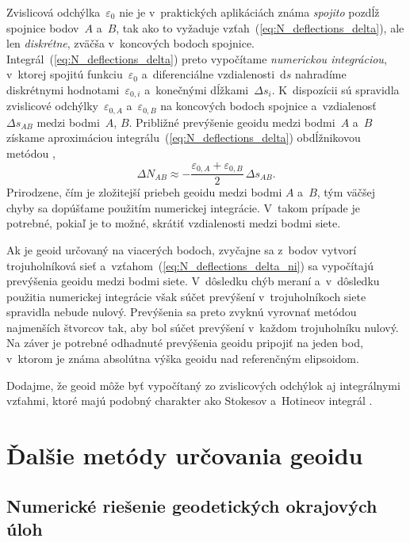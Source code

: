 \documentclass[a4paper, 12pt]{book}
\newcommand{\diff}{\mathrm d}
\begin{document}
Zvislicová odchýlka~$\varepsilon_0$ nie je v~praktických aplikáciách známa 
\emph{spojito} pozdĺž spojnice bodov~$A$ a~$B$, tak ako to vyžaduje 
vzťah~(\ref{eq:N_deflections_delta}), ale len \emph{diskrétne}, zväčša 
v~koncových bodoch spojnice.  Integrál~(\ref{eq:N_deflections_delta}) preto 
vypočítame \emph{numerickou integráciou}, v~ktorej spojitú 
funkciu~$\varepsilon_0$ a~diferenciálne vzdialenosti~$\diff s$ nahradíme 
diskrétnymi hodnotami~$\varepsilon_{0,i}$ a~konečnými dĺžkami~$\Delta s_i$.  
K~dispozícii sú spravidla zvislicové odchýlky~$\varepsilon_{0,A}$ 
a~$\varepsilon_{0,B}$ na koncových bodoch spojnice a~vzdialenosť~$\Delta 
s_{AB}$ medzi bodmi~$A$, $B$.  Približné prevýšenie geoidu medzi bodmi~$A$ 
a~$B$ získame aproximáciou integrálu~(\ref{eq:N_deflections_delta}) 
obdĺžnikovou metódou \parencite[pre popis obdĺžnikovej metódy pozri 
napríklad][]{Macak2021},
%
\begin{equation}
\label{eq:N_deflections_delta_ni}
\Delta N_{AB} \approx -\frac{\varepsilon_{0,A} + \varepsilon_{0,B}}{2} \, 
\Delta s_{AB}{.}
\end{equation}
%
Prirodzene, čím je zložitejší priebeh geoidu medzi bodmi $A$ a~$B$, tým väčšej 
chyby sa dopúšťame použitím numerickej integrácie.  V~takom prípade je 
potrebné, pokiaľ je to možné, skrátiť vzdialenosti medzi bodmi siete.

Ak je geoid určovaný na viacerých bodoch, zvyčajne sa z~bodov vytvorí 
trojuholníková sieť a~vzťahom~(\ref{eq:N_deflections_delta_ni}) sa vypočítajú 
prevýšenia geoidu medzi bodmi siete.  V~dôsledku chýb meraní a~v~dôsledku 
použitia numerickej integrácie však súčet prevýšení v~trojuholníkoch siete 
spravidla nebude nulový.  Prevýšenia sa preto zvyknú vyrovnať metódou 
najmenších štvorcov tak, aby bol súčet prevýšení v~každom trojuholníku nulový.  
Na záver je potrebné odhadnuté prevýšenia geoidu pripojiť na jeden bod, 
v~ktorom je známa absolútna výška geoidu nad referenčným elipsoidom.

Dodajme, že geoid môže byť vypočítaný zo zvislicových odchýlok aj integrálnymi 
vzťahmi, ktoré majú podobný charakter ako Stokesov a~Hotineov integrál 
\parencite[pozri napríklad][]{Sjoberg2017}.


\section{Ďalšie metódy určovania geoidu}
\label{sec:other_geoid_determination_methods}

\subsection{Numerické riešenie geodetických okrajových úloh}
\end{document}
